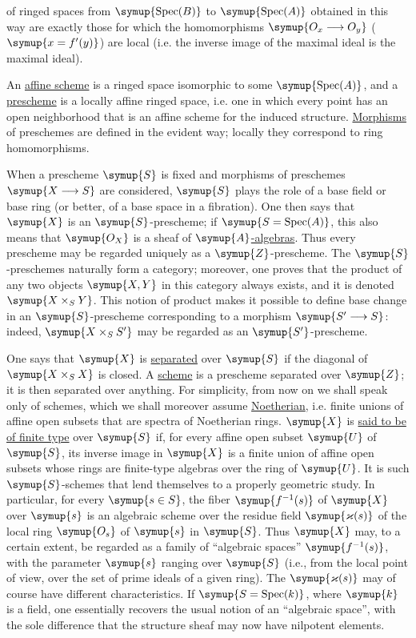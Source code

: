 of ringed spaces from $\symup{\operatorname{Spec}(B)}$ to
$\symup{\operatorname{Spec}(A)}$ obtained in this way are exactly those for which the
homomorphisms $\symup{O_x\longrightarrow O_y}$ ($\symup{x=f'(y)}$) are local (i.e. the
inverse image of the maximal ideal is the maximal ideal).

An \uline{affine scheme} is a ringed space isomorphic to some
$\symup{\operatorname{Spec}(A)}$, and a \uline{prescheme} is a locally affine ringed
space, i.e. one in which every point has an open neighborhood that is an affine
scheme for the induced structure. \uline{Morphisms} of preschemes are defined in the
evident way; locally they correspond to ring homomorphisms.

When a prescheme $\symup{S}$ is fixed and morphisms of preschemes
$\symup{X\longrightarrow S}$ are considered, $\symup{S}$ plays the role of a base field or
base ring (or better, of a base space in a fibration). One then says that $\symup{X}$
is an $\symup{S}$-prescheme; if $\symup{S=\operatorname{Spec}(A)}$, this also means that
$\symup{O_X}$ is a sheaf of $\symup{A}$\uline{-algebras}. Thus every prescheme may be regarded
uniquely as a $\symup{Z}$-prescheme. The $\symup{S}$-preschemes naturally form a
category; moreover, one proves that the product of any two objects $\symup{X,Y}$ in
this category always exists, and it is denoted $\symup{X\times_S Y}$. This notion of
product makes it possible to define base change in an $\symup{S}$-prescheme
corresponding to a morphism $\symup{S'\longrightarrow S}$: indeed, $\symup{X\times_S S'}$ may
be regarded as an $\symup{S'}$-prescheme.

One says that $\symup{X}$ is \uline{separated} over $\symup{S}$ if the diagonal of
$\symup{X\times_S X}$ is closed. A \uline{scheme} is a prescheme separated over
$\symup{Z}$; it is then separated over anything. For simplicity, from now on
we shall speak only of schemes, which we shall moreover assume
\uline{Noetherian}, i.e. finite unions of affine open subsets that are spectra
of Noetherian rings. $\symup{X}$ is \uline{said to be of finite type} over $\symup{S}$ if,
for every affine open subset $\symup{U}$ of $\symup{S}$, its inverse image in $\symup{X}$ is a finite
union of affine open subsets whose rings are finite-type algebras over the ring
of $\symup{U}$. It is such $\symup{S}$-schemes that lend themselves to a properly geometric
study. In particular, for every $\symup{s\in S}$, the fiber $\symup{f^{-1}(s)}$ of $\symup{X}$ over
$\symup{s}$ is an algebraic scheme over the residue field $\symup{\varkappa(s)}$ of the local ring
$\symup{O_s}$ of $\symup{s}$ in $\symup{S}$. Thus $\symup{X}$ may, to a certain extent, be regarded as a
family of “algebraic spaces” $\symup{f^{-1}(s)}$, with the parameter $\symup{s}$ ranging over
$\symup{S}$ (i.e., from the local point of view, over the set of prime ideals of a
given ring). The $\symup{\varkappa(s)}$ may of course have different characteristics. If
$\symup{S=\operatorname{Spec}(k)}$, where $\symup{k}$ is a field, one essentially recovers the
usual notion of an “algebraic space”, with the sole difference that the
structure sheaf may now have nilpotent elements.

